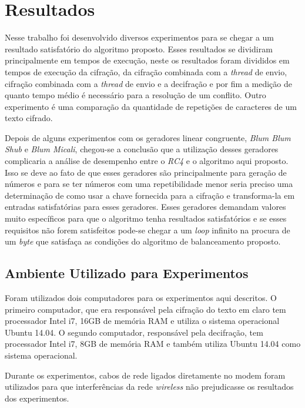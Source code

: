 \chapter{Resultados}
\label{results}

Nesse trabalho foi desenvolvido diversos experimentos para se chegar a um resultado satisfatório do algoritmo proposto. Esses resultados se dividiram principalmente em tempos de execução, neste os resultados foram divididos em tempos de execução da cifração, da cifração combinada com a \textit{thread} de envio, cifração combinada com a \textit{thread} de envio e a decifração e por fim a medição de quanto tempo médio é necessário para a resolução de um conflito. Outro experimento é uma comparação da quantidade de repetições de caracteres de um texto cifrado.

Depois de alguns experimentos com os geradores linear congruente, \textit{Blum Blum Shub} e \textit{Blum Micali}, chegou-se a conclusão que a utilização desses geradores complicaria a análise de desempenho entre o \textit{RC4} e o algoritmo aqui proposto. Isso se deve ao fato de que esses geradores são principalmente para geração de números e para se ter números com uma repetibilidade menor seria preciso uma determinação de como usar a chave fornecida para a cifração e transforma-la em entradas satisfatórias para esses geradores. Esses geradores demandam valores muito específicos para que o algoritmo tenha resultados satisfatórios e se esses requisitos não forem satisfeitos pode-se chegar a um \textit{loop} infinito na procura de um \textit{byte} que satisfaça as condições do algoritmo de balanceamento proposto.

\section{Ambiente Utilizado para Experimentos}

Foram utilizados dois computadores para os experimentos aqui descritos. O primeiro computador, que era responsável pela cifração do texto em claro tem processador Intel i7, 16GB de memória RAM e utiliza o sistema operacional Ubuntu 14.04. O segundo computador, responsável pela decifração, tem processador Intel i7, 8GB de memória RAM e também utiliza Ubuntu 14.04 como sistema operacional.

Durante os experimentos, cabos de rede ligados diretamente no modem foram utilizados para que interferências da rede \textit{wireless} não prejudicasse os resultados dos experimentos. 

